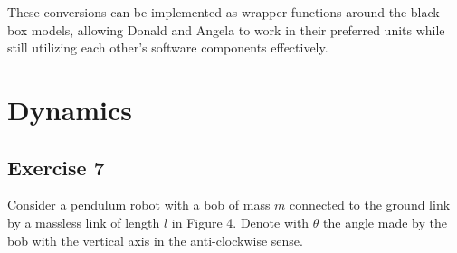 \begin{solution}
These conversions can be implemented as wrapper functions around the black-box models, allowing Donald and Angela to work in their preferred units while still utilizing each other's software components effectively.

\end{solution}


\section{Dynamics}
\subsection{Exercise 7}
Consider a pendulum robot with a bob of mass $m$ connected to the ground link by a massless link of length $l$ in Figure 4. Denote with $\theta$ the angle made by the bob with the vertical axis in the anti-clockwise sense.

